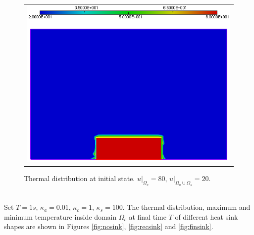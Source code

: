 \begin{figure}[http]
	\centering
	\begin{tabular}{c}
		\includegraphics[width=.8\linewidth]{figures/begin}
	\end{tabular}
	\caption{Thermal distribution at initial state. $u|_{\Omega_{c}} = 80$, $u|_{\Omega_{a}\cup\Omega_{s}}=20$.}
	\label{fig:ini}
\end{figure}\\
Set $T=1s$, $\kappa_a=0.01$, $\kappa_c=1$, $\kappa_s=100$. The thermal distribution, maximum and minimum temperature inside domain $\Omega_{c}$  at final time $T$ of different heat sink shapes are shown in Figures \ref{fig:nosink}, \ref{fig:recsink} and \ref{fig:finsink}.\\
